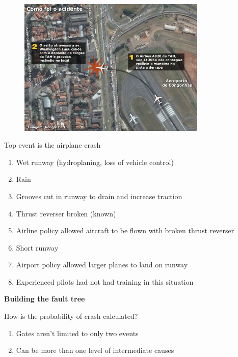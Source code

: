 \documentclass[aspectratio=1610,pdftex,dvipsnames,compress,xcolor={dvipsnames}]{beamer}
\begin{document}
\begin{frame}{}
    \begin{figure}
        \centering
        \includegraphics[width=0.80\textwidth]{brazil_airport.jpg}
    \end{figure}
\end{frame}


\begin{frame}{Top event is the airplane crash}
    \begin{enumerate}[series=outerlist,topsep=0pt,itemsep=11pt,leftmargin=*,label=(\arabic*)]
        \item[]Wet runway (hydroplaning, loss of vehicle control)  
        \item[]Rain
        \item[]Grooves cut in runway to drain and increase traction  
        \item[]Thrust reverser broken (known)
        \item[]Airline policy allowed aircraft to be flown with broken thrust reverser  
        \item[]Short runway   
        \item[]Airport policy allowed larger planes to land on runway  
        \item[]Experienced pilots had not had training in this situation  
    \end{enumerate}
\end{frame}


\begin{frame}[plain]{}
    \centering\LARGE\textbf{Building the fault tree}
\end{frame}


\addtocounter{framenumber}{-1}
\begin{frame}{How is the probability of crash calculated?}
    \begin{enumerate}[series=outerlist,topsep=0pt,itemsep=21pt,leftmargin=*,label=(\arabic*)]
        \item[]Gates aren't limited to only two events  
        \item[]Can be more than one level of intermediate causes
    \end{enumerate}
\end{frame}
\end{document}

